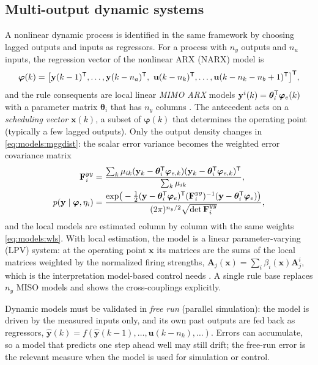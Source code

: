 \subsection{Multi-output dynamic systems}\label{sec:models:mimo}

A nonlinear dynamic process is identified in the same framework by choosing lagged outputs and inputs as regressors. For a process with $n_y$ outputs and $n_u$ inputs, the regression vector of the nonlinear ARX (NARX) model is
\begin{equation}
  \boldsymbol\varphi(k)=\big[\mathbf{y}(k-1)\T,\dots,\mathbf{y}(k-n_a)\T,\ \mathbf{u}(k-n_k)\T,\dots,\mathbf{u}(k-n_k-n_b+1)\T\big]\T,
  \label{eq:models:regressors}
\end{equation}
and the rule consequents are local linear \emph{MIMO ARX} models $\mathbf{y}^i(k)=\boldsymbol\theta_i^{\mathsf{T}}\boldsymbol\varphi_e(k)$ with a parameter matrix $\boldsymbol\theta_i$ that has $n_y$ columns \cite{abonyi:2002:mimo,feil:2004:mimo}. The antecedent acts on a \emph{scheduling vector} $\mathbf{x}(k)$, a subset of $\boldsymbol\varphi(k)$ that determines the operating point (typically a few lagged outputs). Only the output density changes in \eqref{eq:models:mggdist}: the scalar error variance becomes the weighted error covariance matrix
\begin{align}
  \mathbf{F}^{yy}_i&=\frac{\sum_k\mu_{ik}(\mathbf{y}_k-\boldsymbol\theta_i^{\mathsf{T}}\boldsymbol\varphi_{e,k})(\mathbf{y}_k-\boldsymbol\theta_i^{\mathsf{T}}\boldsymbol\varphi_{e,k})^{\mathsf{T}}}{\sum_k\mu_{ik}},
  \label{eq:models:fyy}\\
  p(\mathbf{y}\mid\boldsymbol\varphi,\eta_i)&=\frac{\exp\!\big(-\tfrac12(\mathbf{y}-\boldsymbol\theta_i^{\mathsf{T}}\boldsymbol\varphi_e)^{\mathsf{T}}(\mathbf{F}^{yy}_i)^{-1}(\mathbf{y}-\boldsymbol\theta_i^{\mathsf{T}}\boldsymbol\varphi_e)\big)}{(2\pi)^{n_y/2}\sqrt{\det\mathbf{F}^{yy}_i}},
  \label{eq:models:mimodensity}
\end{align}
and the local models are estimated column by column with the same weights \eqref{eq:models:wls}. With local estimation, the model is a linear parameter-varying (LPV) system: at the operating point $\mathbf{x}$ its matrices are the sums of the local matrices weighted by the normalized firing strengths, $\mathbf{A}_j(\mathbf{x})=\sum_i\beta_i(\mathbf{x})\mathbf{A}^i_j$, which is the interpretation model-based control needs \cite{johansen:2000:interpretation}. A single rule base replaces $n_y$ MISO models and shows the cross-couplings explicitly.

Dynamic models must be validated in \emph{free run} (parallel simulation): the model is driven by the measured inputs only, and its own past outputs are fed back as regressors, $\hat{\mathbf{y}}(k)=f(\hat{\mathbf{y}}(k-1),\dots,\mathbf{u}(k-n_k),\dots)$. Errors can accumulate, so a model that predicts one step ahead well may still drift; the free-run error is the relevant measure when the model is used for simulation or control.


